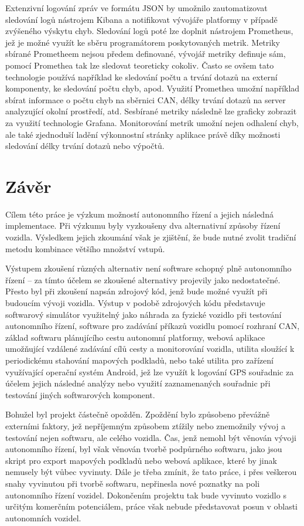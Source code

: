 \documentclass[czech, bachelor]{diploma}
\begin{document}
Extenzivní logování zpráv ve formátu JSON by umožnilo zautomatizovat sledování logů nástrojem Kibana\cite{elk-source} a
notifikovat vývojáře platformy v případě zvýšeného výskytu chyb. Sledování logů poté lze doplnit nástrojem Prometheus\cite{
prometheus-source}, jež je možné využít ke sběru programátorem poskytovaných metrik. Metriky sbírané Prometheem nejsou předem
definované, vývojář metriky definuje sám, pomocí Promethea tak lze sledovat teoreticky cokoliv. Často se ovšem tato technologie
používá například ke sledování počtu a trvání dotazů na externí komponenty, ke sledování počtu chyb, apod. Využití Promethea
umožní například sbírat informace o počtu chyb na sběrnici CAN, délky trvání dotazů na server analyzující okolní prostředí, atd.
Sesbírané metriky následně lze graficky zobrazit za využití technologie Grafana. Monitorování metrik umožní nejen odhalení chyb,
ale také zjednoduší ladění výkonnostní stránky aplikace právě díky možnosti sledování délky trvání dotazů nebo výpočtů.

\chapter{Závěr}

Cílem této práce je výzkum možností autonomního řízení a jejich následná implementace. Při výzkumu byly vyzkoušeny dva
alternativní způsoby řízení vozidla. Výsledkem jejich zkoumání však je zjištění, že bude nutné zvolit tradiční metodu kombinace
většího množství vstupů.

Výstupem zkoušení různých alternativ není software schopný plně autonomního řízení -- za tímto účelem se zkoušené alternativy
projevily jako nedostatečné. Přesto byl při zkoušení napsán zdrojový kód, jenž bude možné využít při budoucím vývoji vozidla.
Výstup v podobě zdrojových kódu představuje softwarový simulátor využitelný jako náhrada za fyzické vozidlo při testování
autonomního řízení, software pro zadávání příkazů vozidlu pomocí rozhraní CAN, základ softwaru plánujícího cestu autonomní
platformy, webová aplikace umožňující vzdálené zadávání cílů cesty a monitorování vozidla, utilita sloužící k periodickému
stahování mapových podkladů, nebo také utilita pro zařízení využívající operační systém Android, jež lze využít k logování GPS
souřadnic za účelem jejich následné analýzy nebo využití zaznamenaných souřadnic při testování jiných softwarových komponent.

Bohužel byl projekt částečně opožděn. Zpoždění bylo způsobeno převážně externími faktory, jež nepříjemným způsobem ztížily nebo
znemožnily vývoj a testování nejen softwaru, ale celého vozidla. Čas, jenž nemohl být věnován vývoji autonomního řízení, byl však
věnován tvorbě podpůrného softwaru, jako jsou skript pro export mapových podkladů nebo webová aplikace, které by jinak nemusely
být vůbec vyvinuty. Dále je třeba zmínit, že tato práce, i přes veškerou snahy vyvinutou při tvorbě softwaru, nepřinesla nové
poznatky na poli autonomního řízení vozidel. Dokončením projektu tak bude vyvinuto vozidlo s určitým komerčním potenciálem, práce
však nebude představovat posun v oblasti autonomních vozidel.
\end{document}
